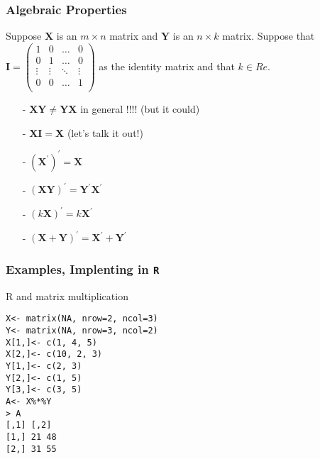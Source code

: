 \documentclass{beamer}
\numberwithin{equation}{section}
\begin{document}
\begin{frame}
\frametitle{Algebraic Properties} 

Suppose $\boldsymbol{X}$ is an $m \times n$ matrix and $\boldsymbol{Y}$ is an $n \times k$ matrix.  Suppose that $\boldsymbol{I} = \begin{pmatrix} 1 & 0 & \hdots & 0 \\
						0 & 1 & \hdots & 0 \\
						\vdots & \vdots & \ddots & \vdots \\
						0 			&   0 		& \hdots & 1 \\
						\end{pmatrix} $ as the \alert{identity} matrix and that $k \in Re$.  
\begin{itemize}
\item[-] $\boldsymbol{X} \boldsymbol{Y} \neq \boldsymbol{Y} \boldsymbol{X}$ \alert{in general !!!!} (but it could)
\item[-] $\boldsymbol{X}\boldsymbol{I} = \boldsymbol{X}$ (let's talk it out!)
\item[-] $(\boldsymbol{X}^{'} )^{'} = \boldsymbol{X}$
\item[-] $(\boldsymbol{X} \boldsymbol{Y})^{'} = \boldsymbol{Y}^{'} \boldsymbol{X}^{'}$
\item[-] $(k \boldsymbol{X})^{'} = k \boldsymbol{X}^{'}$
\item[-] $(\boldsymbol{X} + \boldsymbol{Y})^{'}  = \boldsymbol{X}^{'} + \boldsymbol{Y}^{'} $
\end{itemize}




\end{frame}

\begin{frame}
\frametitle{Examples, Implenting in {\tt R} } 
R and matrix multiplication


{\tt X<- matrix(NA, nrow=2, ncol=3) } \\
{\tt Y<- matrix(NA, nrow=3, ncol=2) } \\
{\tt X[1,]<- c(1, 4, 5) } \\
{\tt X[2,]<- c(10, 2, 3)} \\

{\tt Y[1,]<- c(2, 3)} \\
{\tt Y[2,]<- c(1, 5)} \\
{\tt Y[3,]<- c(3, 5)} \\

\vspace{0.1in}
{\tt A<- X\%*\%Y} \\
{\tt > A } \\
{\tt      [,1] [,2]} \\
{\tt [1,]   21   48} \\
{\tt [2,]   31   55 } 

\end{frame}
\end{document}
